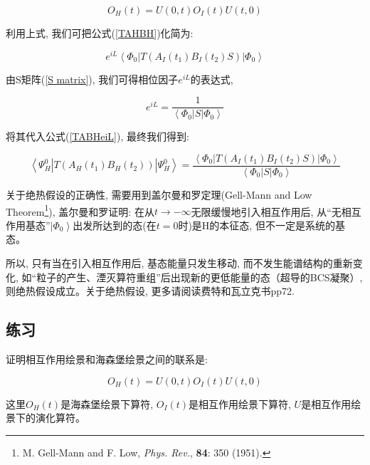 \begin{equation*}
O_H(t) = U(0,t)O_I(t) U(t,0)
\end{equation*}


利用上式, 我们可把公式(\ref{TAHBH})化简为:

\begin{equation}\label{TABHeiL}
e^{iL} \left\langle \Phi_0 \right| T \left( A_I(t_1) B_I(t_2) S
\right) \left| \Phi_0 \right\rangle
\end{equation}


由S矩阵(\ref{S matrix}), 我们可得相位因子$e^{iL}$的表达式,

\begin{equation*}
e^{iL} = \frac{1}{\left\langle \Phi_0 \right|S \left| \Phi_0
\right\rangle}
\end{equation*}

将其代入公式(\ref{TABHeiL}), 最终我们得到:

\begin{equation}\label{TABoverPhiSquared}
\left\langle \Psi_H^0 \right| T \left( A_H(t_1) B_H(t_2) \right)
\left| \Psi_H^0 \right\rangle = \frac{\left\langle \Phi_0 \right| T
\left( A_I(t_1) B_I(t_2) S \right) \left| \Phi_0
\right\rangle}{\left\langle \Phi_0 \right| S \left| \Phi_0
\right\rangle}
\end{equation}

关于绝热假设的正确性, 需要用到盖尔曼和罗定理(Gell-Mann and Low Theorem\footnote{M. Gell-Mann and F. Low, \textit{Phys. Rev.},
\textbf{84}: 350 (1951).}), 盖尔曼和罗证明: 在从$t \to -
\infty$无限缓慢地引入相互作用后, 从“无相互作用基态”$\left| \Phi_0 \right\rangle$出发所达到的态(在$t=0$时)是H的本征态, 但不一定是系统的基态。

所以, 只有当在引入相互作用后, 基态能量只发生移动,
而不发生能谱结构的重新变化, 如“粒子的产生、湮灭算符重组”后出现新的更低能量的态（超导的BCS凝聚）, 则绝热假设成立。关于绝热假设, 更多请阅读费特和瓦立克书pp72.


\subsection*{练习}

证明相互作用绘景和海森堡绘景之间的联系是:

\begin{equation*}
O_H(t) = U(0,t)O_I(t) U(t,0)
\end{equation*}

这里$O_H(t)$是海森堡绘景下算符, $O_I (t)$是相互作用绘景下算符,
$U$是相互作用绘景下的演化算符。

